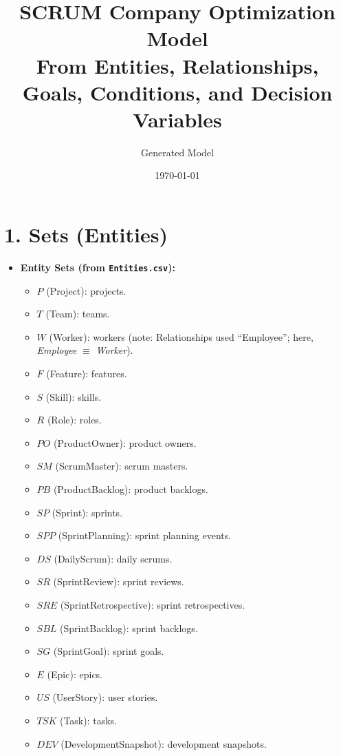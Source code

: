 \documentclass[11pt,a4paper]{article}
\title{SCRUM Company Optimization Model\\\large From Entities, Relationships, Goals, Conditions, and Decision Variables}
\author{Generated Model}
\date{\today}
\begin{document}
\maketitle
\tableofcontents
\newpage

\section{1. Sets (Entities)}
\begin{itemize}[leftmargin=2em]

\item \textbf{Entity Sets (from \texttt{Entities.csv}):}
  \begin{itemize}
    \item $P$ (\textsf{Project}): projects.
    \item $T$ (\textsf{Team}): teams.
    \item $W$ (\textsf{Worker}): workers (note: Relationships used ``Employee''; here, \emph{Employee} $\equiv$ \emph{Worker}).
    \item $F$ (\textsf{Feature}): features.
    \item $S$ (\textsf{Skill}): skills.
    \item $R$ (\textsf{Role}): roles.
    \item $PO$ (\textsf{ProductOwner}): product owners.
    \item $SM$ (\textsf{ScrumMaster}): scrum masters.
    \item $PB$ (\textsf{ProductBacklog}): product backlogs.
    \item $SP$ (\textsf{Sprint}): sprints.
    \item $SPP$ (\textsf{SprintPlanning}): sprint planning events.
    \item $DS$ (\textsf{DailyScrum}): daily scrums.
    \item $SR$ (\textsf{SprintReview}): sprint reviews.
    \item $SRE$ (\textsf{SprintRetrospective}): sprint retrospectives.
    \item $SBL$ (\textsf{SprintBacklog}): sprint backlogs.
    \item $SG$ (\textsf{SprintGoal}): sprint goals.
    \item $E$ (\textsf{Epic}): epics.
    \item $US$ (\textsf{UserStory}): user stories.
    \item $TSK$ (\textsf{Task}): tasks.
    \item $DEV$ (\textsf{DevelopmentSnapshot}): development snapshots.

\end{itemize}
\end{itemize}
\end{document}
